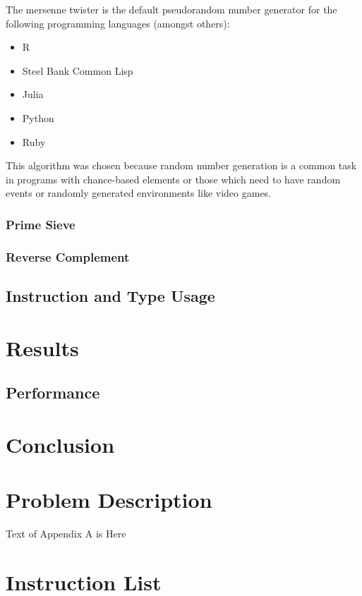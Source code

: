\documentclass[english,a4paper]{report}
\begin{document}
The mersenne twister is the default pseudorandom number generator for
the following programming languages (amongst others):
\begin{itemize}
	\item R \cite{R}
	\item Steel Bank Common Lisp \cite{SBCL}
	\item Julia \cite{Julia}
	\item Python \cite{Python}
	\item Ruby \cite{Ruby}
\end{itemize}

This algorithm was chosen because random number generation is a common
task in programs with chance-based elements or those which need to
have random events or randomly generated environments like video
games.

\subsection{Prime Sieve}


\subsection{Reverse Complement}

\section{Instruction and Type Usage}


\chapter{Results}

\section{Performance}

\chapter{Conclusion}

\newpage{}
\appendix
\chapter{Problem Description} 

Text of Appendix A is Here

\chapter{Instruction List} 
\end{document}
